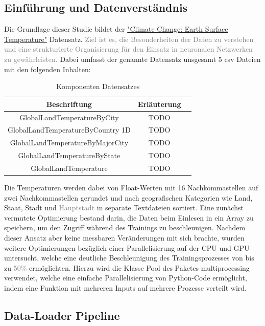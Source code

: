 \documentclass[manuscript,screen,review]{acmart}
\begin{document}
\subsection*{Einführung und Datenverständnis}
Die Grundlage dieser Studie bildet der \href{https://www.kaggle.com/datasets/berkeleyearth/climate-change-earth-surface-temperature-data?select=GlobalLandTemperaturesByCity.csv}{"Climate Change: Earth Surface Temperature"} Datensatz. 
\textcolor{gray}{Ziel ist es, die Besonderheiten der Daten zu verstehen und eine strukturierte Organisierung für den Einsatz in neuronalen Netzwerken zu gewährleisten.} 
Dabei umfasst der genannte Datensatz unsgesamt 5 csv Dateien mit den folgenden Inhalten:
\todo[]{}
\begin{table}
  \caption{Komponenten Datensatzes}
  \label{tab:freq}
  \begin{tabular}{ccl}
    \toprule
    Beschriftung & Erläuterung\\
    \midrule
    GlobalLandTemperatureByCity & TODO \\
    GlobalLandTemperatureByCountry 1D & TODO \\
    GlobalLandTemperatureByMajorCity & TODO \\
    GlobalLandTemperatureByState & TODO \\
    GlobalLandTemperature & TODO \\
  \bottomrule
\end{tabular}
\end{table}
Die Temperaturen werden dabei von Float-Werten mit 16 Nachkommastellen auf zwei Nachkommastellen gerundet und nach geografischen Kategorien wie Land, Staat, Stadt und \textcolor{gray}{Hauptstadt} in separate Textdateien sortiert. 
Eine zunächst vermutete Optimierung bestand darin, die Daten beim Einlesen in ein Array zu speichern, um den Zugriff während des Trainings zu beschleunigen.
Nachdem dieser Ansatz aber keine messbaren Veränderungen mit sich brachte, wurden weitere Optimierungen bezüglich einer Parallelisierung auf der CPU und GPU untersucht, 
welche eine deutliche Beschleunigung des Trainingsprozesses von bis zu \textcolor{gray}{50\%} ermöglichten. 
Hierzu wird die Klasse Pool des Paketes multiprocessing verwendet, welche eine einfache Parallelisierung von Python-Code ermöglicht, indem eine Funktion mit mehreren Inputs auf mehrere Prozesse verteilt wird.


\subsection*{Data-Loader Pipeline}
\end{document}
